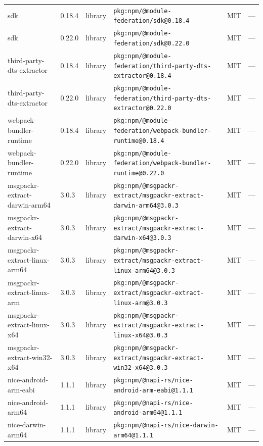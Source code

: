 \documentclass[11pt,a4paper]{article}
\begin{document}
\begin{longtable}{|p{4cm}|p{2cm}|p{1.6cm}|p{5cm}|p{1.5cm}|p{3.5cm}|}
\raggedright sdk & 0.18.4 & library & \small\texttt{pkg:npm/@module-federation/sdk@0.18.4} & MIT & \small — \\
\raggedright sdk & 0.22.0 & library & \small\texttt{pkg:npm/@module-federation/sdk@0.22.0} & MIT & \small — \\
\raggedright third-party-dts-extractor & 0.18.4 & library & \small\texttt{pkg:npm/@module-federation/third-party-dts-extractor@0.18.4} & MIT & \small — \\
\raggedright third-party-dts-extractor & 0.22.0 & library & \small\texttt{pkg:npm/@module-federation/third-party-dts-extractor@0.22.0} & MIT & \small — \\
\raggedright webpack-bundler-runtime & 0.18.4 & library & \small\texttt{pkg:npm/@module-federation/webpack-bundler-runtime@0.18.4} & MIT & \small — \\
\raggedright webpack-bundler-runtime & 0.22.0 & library & \small\texttt{pkg:npm/@module-federation/webpack-bundler-runtime@0.22.0} & MIT & \small — \\
\raggedright msgpackr-extract-darwin-arm64 & 3.0.3 & library & \small\texttt{pkg:npm/@msgpackr-extract/msgpackr-extract-darwin-arm64@3.0.3} & MIT & \small — \\
\raggedright msgpackr-extract-darwin-x64 & 3.0.3 & library & \small\texttt{pkg:npm/@msgpackr-extract/msgpackr-extract-darwin-x64@3.0.3} & MIT & \small — \\
\raggedright msgpackr-extract-linux-arm64 & 3.0.3 & library & \small\texttt{pkg:npm/@msgpackr-extract/msgpackr-extract-linux-arm64@3.0.3} & MIT & \small — \\
\raggedright msgpackr-extract-linux-arm & 3.0.3 & library & \small\texttt{pkg:npm/@msgpackr-extract/msgpackr-extract-linux-arm@3.0.3} & MIT & \small — \\
\raggedright msgpackr-extract-linux-x64 & 3.0.3 & library & \small\texttt{pkg:npm/@msgpackr-extract/msgpackr-extract-linux-x64@3.0.3} & MIT & \small — \\
\raggedright msgpackr-extract-win32-x64 & 3.0.3 & library & \small\texttt{pkg:npm/@msgpackr-extract/msgpackr-extract-win32-x64@3.0.3} & MIT & \small — \\
\raggedright nice-android-arm-eabi & 1.1.1 & library & \small\texttt{pkg:npm/@napi-rs/nice-android-arm-eabi@1.1.1} & MIT & \small — \\
\raggedright nice-android-arm64 & 1.1.1 & library & \small\texttt{pkg:npm/@napi-rs/nice-android-arm64@1.1.1} & MIT & \small — \\
\raggedright nice-darwin-arm64 & 1.1.1 & library & \small\texttt{pkg:npm/@napi-rs/nice-darwin-arm64@1.1.1} & MIT & \small — \\

\end{longtable}
\end{document}

